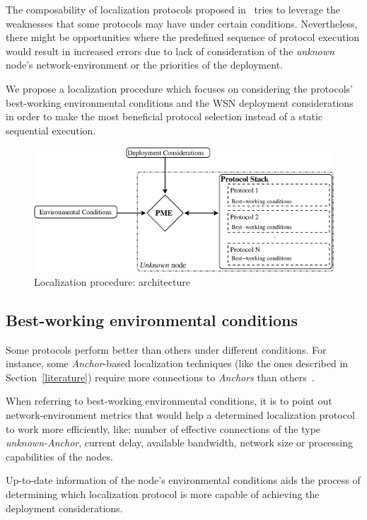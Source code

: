 The composability of localization protocols proposed in~\cite{composability} tries to leverage the weaknesses that some protocols may have under certain conditions. Nevertheless, there might be opportunities where the predefined sequence of protocol execution would result in increased errors due to lack of consideration of the \emph{unknown} node's network-environment or the priorities of the deployment.

We propose a localization procedure which focuses on considering the protocols' best-working environmental conditions and the WSN deployment considerations in order to make the most beneficial protocol selection instead of a static sequential execution.

\begin{figure}[tb]
  \centering
  \includegraphics[width=0.83\linewidth]{section3/figures/LocProc_small.eps}
  \caption{Localization procedure: architecture
  \label{fig:LocProc}}
\end{figure}

\subsection{Best-working environmental conditions}\label{bestWorkingConditions}
Some protocols perform better than others under different conditions. For instance, some \emph{Anchor}-based localization techniques (like the ones described in Section~\ref{literature}) require more connections to \emph{Anchors} than others~\cite{rang:loc:techniques}.

When referring to best-working environmental conditions, it is to point out network-environment metrics that would help a determined localization protocol to work more efficiently, like: number of effective connections of the type \emph{unknown-Anchor}, current delay, available bandwidth, network size or processing capabilities of the nodes.

Up-to-date information of the node's environmental conditions aids the process of determining which localization protocol is more capable of achieving the deployment considerations.

